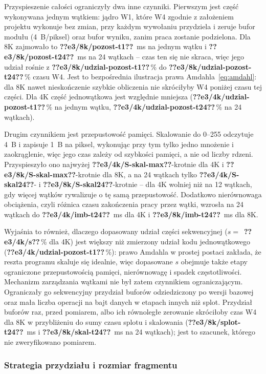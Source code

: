 \documentclass[12pt,a4paper]{article}
\providecommand{\wynik}[1]{\textbf{??#1??}}
\begin{document}
Przyspieszenie całości ograniczyły dwa inne czynniki. Pierwszym jest część wykonywana jednym wątkiem: jądro W1, które W4 zgodnie z założeniem projektu wykonuje bez zmian, przy każdym wywołaniu przydziela i zeruje bufor modułu (4~B/piksel) oraz bufor wyniku, zanim praca zostanie podzielona. Dla 8K zajmowało to \wynik{e3/8k/pozost-t1}~ms na jednym wątku i \wynik{e3/8k/pozost-t24}~ms na 24 wątkach -- czas ten się nie skraca, więc jego udział rośnie z \wynik{e3/8k/udzial-pozost-t1}\,\% do \wynik{e3/8k/udzial-pozost-t24}\,\% czasu W4. Jest to bezpośrednia ilustracja prawa Amdahla~\eqref{eq:amdahl}: dla 8K nawet nieskończenie szybkie obliczenia nie skróciłyby W4 poniżej czasu tej części. Dla 4K część jednowątkowa jest względnie mniejsza (\wynik{e3/4k/udzial-pozost-t1}\,\% na jednym wątku, \wynik{e3/4k/udzial-pozost-t24}\,\% na 24 wątkach).

Drugim czynnikiem jest przepustowość pamięci. Skalowanie do 0--255 odczytuje 4~B i zapisuje 1~B na piksel, wykonując przy tym tylko jedno mnożenie i zaokrąglenie, więc jego czas zależy od szybkości pamięci, a nie od liczby rdzeni. Przyspieszyło ono najwyżej \wynik{e3/4k/S-skal-max}-krotnie dla 4K i \wynik{e3/8k/S-skal-max}-krotnie dla 8K, a na 24 wątkach tylko \wynik{e3/4k/S-skal24}- i \wynik{e3/8k/S-skal24}-krotnie -- dla 4K wolniej niż na 12 wątkach, gdy więcej wątków rywalizuje o tę samą przepustowość. Dodatkowo nierównowaga obciążenia, czyli różnica czasu zakończenia pracy przez wątki, wzrosła na 24 wątkach do \wynik{e3/4k/imb-t24}~ms dla 4K i \wynik{e3/8k/imb-t24}~ms dla 8K.

Wyjaśnia to również, dlaczego dopasowany udział części sekwencyjnej ($s = $~\wynik{e3/4k/s}\,\% dla 4K) jest większy niż zmierzony udział kodu jednowątkowego (\wynik{e3/4k/udzial-pozost-t1}\,\%): prawo Amdahla w prostej postaci zakłada, że reszta programu skaluje się idealnie, więc dopasowane $s$ obejmuje także etapy ograniczone przepustowością pamięci, nierównowagę i spadek częstotliwości. Mechanizm zarządzania wątkami nie był zatem czynnikiem ograniczającym. Ograniczały go sekwencyjny przydział buforów odziedziczony po wersji bazowej oraz mała liczba operacji na bajt danych w etapach innych niż splot. Przydział buforów raz, przed pomiarem, albo ich równoległe zerowanie skróciłoby czas W4 dla 8K w przybliżeniu do sumy czasu splotu i skalowania (\wynik{e3/8k/splot-t24}~ms i \wynik{e3/8k/skal-t24}~ms na 24 wątkach); jest to szacunek, którego nie zweryfikowano pomiarem.


\subsubsection{Strategia przydziału i rozmiar fragmentu}
\end{document}
